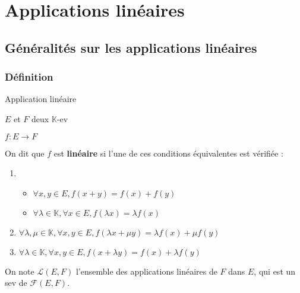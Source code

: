 \chapter{Applications linéaires}
\chaptertoc

\section[Généralités]{Généralités sur les applications linéaires}

\subsection{Définition}

    \begin{defi}{Application linéaire}{}
        \begin{soient}
            \begin{multicols}{2}
                \item $E$ et $F$ deux $\mathbb{K}$-ev 
                \item $f : E \to F$
            \end{multicols}
        \end{soient}
        On dit que $f$ est \textbf{linéaire} si l’une de ces conditions équivalentes est vérifiée :
        \begin{enumerate}[label=\textcolor{myyellow}{\textit{(\alph*)}}]
            \item \begin{itemize}
                \item $\forall x,y \in E, f(x+y) = f(x) + f(y)$
                \item $\forall \lambda \in \mathbb{K}, \forall x \in E, f(\lambda x) = \lambda f(x)$
            \end{itemize}
            \item $\forall \lambda,\mu \in \mathbb{K}, \forall x,y \in E, f(\lambda x + \mu y)= \lambda f(x) + \mu f(y)$
            \item $\forall \lambda \in \mathbb{K}, \forall x,y \in E, f( x + \lambda y)= f(x) + \lambda f(y)$
        \end{enumerate}
        On note $\mathcal{L}(E,F)$ l’ensemble des applications linéaires de $F$ dans $E$, qui est un sev de $\mathcal{F}(E,F)$.


\end{defi}
